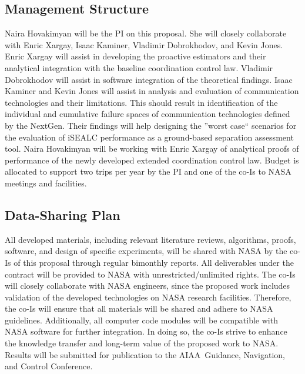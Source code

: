 \documentclass[letter,onecolumn,12pt]{aiaa-tc}
\newcommand{\1}{1_n}
\begin{document}
\subsection{Management Structure}

Naira Hovakimyan will be the PI on this proposal. She will closely collaborate with Enric Xargay, Isaac Kaminer, Vladimir Dobrokhodov, and Kevin Jones. Enric Xargay will assist in developing the proactive estimators and their analytical integration with the baseline coordination control law. Vladimir Dobrokhodov will assist in software integration of the theoretical findings. Isaac Kaminer and Kevin Jones will assist in analysis and evaluation of communication technologies and their limitations. This should result in identification of the individual and cumulative failure spaces of communication technologies defined by the NextGen. Their findings will help designing the ''worst case`` scenarios for the evaluation of iSEALC performance as a ground-based separation assessment tool. Naira Hovakimyan will be working with Enric Xargay of analytical proofs of  performance of the newly developed extended coordination control law. Budget is allocated to support two trips per year by the PI and one of the co-Is to NASA meetings and facilities.

\subsection{Data-Sharing Plan}

All developed materials, including relevant literature reviews, algorithms, proofs, software, and design of specific experiments, will be shared with NASA by the co-Is of this proposal through regular bimonthly reports. All deliverables under the contract will be provided to NASA with unrestricted/unlimited rights. The co-Is will closely collaborate with NASA engineers, since the proposed work includes validation of the developed technologies on NASA research facilities. Therefore, the co-Is will ensure that all materials will be shared and adhere to NASA guidelines. Additionally, all computer code modules will be compatible with NASA software for further integration. In doing so, the co-Is strive to enhance the knowledge transfer and long-term value of the proposed work to NASA. Results will be submitted for publication to the AIAA~Guidance, Navigation, and Control Conference.
\end{document}
